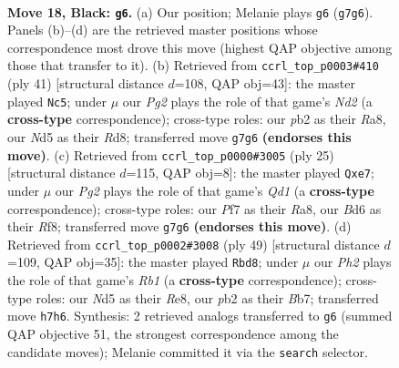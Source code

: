 \documentclass[11pt]{article}
\begin{document}
\clearpage

\begin{figure}[p]\centering
\begin{subfigure}{0.46\textwidth}\centering
\resizebox{\linewidth}{!}{%
\newchessgame
\chessboard[
  setfen={r6r/p2nkppp/2pbp3/1q1n1PP1/Np1P3N/4P2P/PP6/R1BQ1RK1 b - - 0 18},
  showmover=false,
  pgfstyle=straightmove, color=movearrow, markmove={g7-g6}
]}
\caption{}
\end{subfigure}\hfill
\begin{subfigure}{0.46\textwidth}\centering
\resizebox{\linewidth}{!}{%
\newchessgame
\chessboard[
  setfen={r2r2k1/1p1n1pbp/2p2np1/p3pP2/P2qP3/2N2QP1/1PP3BP/R1B1K2R b KQ - 8 21},
  showmover=false,
  pgfstyle=straightmove, color=movearrow, markmove={d7-c5}
]}
\caption{}
\end{subfigure}
\\[4pt]
\begin{subfigure}{0.46\textwidth}\centering
\resizebox{\linewidth}{!}{%
\newchessgame
\chessboard[
  setfen={r2q1rk1/1p2Nppp/3pbn2/4p3/p1PnP3/4BP2/PP1Q2PP/R1N1KB1R b KQ - 0 13},
  showmover=false,
  pgfstyle=straightmove, color=movearrow, markmove={d8-e7}
]}
\caption{}
\end{subfigure}\hfill
\begin{subfigure}{0.46\textwidth}\centering
\resizebox{\linewidth}{!}{%
\newchessgame
\chessboard[
  setfen={1r2r1k1/1b3pp1/pp1pp3/6qn/2P1PnNp/4RP2/PPRQN1PP/5BK1 b - - 6 25},
  showmover=false,
  pgfstyle=straightmove, color=movearrow, markmove={b8-d8}
]}
\caption{}
\end{subfigure}
\caption{\textbf{Move 18, Black: \texttt{g6}.} (a) Our position; Melanie plays \texttt{g6} (\texttt{g7g6}). Panels (b)--(d) are the retrieved master positions whose correspondence most drove this move (highest QAP objective among those that transfer to it). (b) Retrieved from \texttt{ccrl\_top\_p0003\#410} (ply 41) [structural distance $d$=108, QAP obj=43]: the master played \texttt{Nc5}; under $\mu$ our \emph{Pg2} plays the role of that game's \emph{Nd2} (a \textbf{cross-type} correspondence); cross-type roles: our \emph{p}b2 as their \emph{R}a8, our \emph{N}d5 as their \emph{R}d8; transferred move \texttt{g7g6} \textbf{(endorses this move)}. (c) Retrieved from \texttt{ccrl\_top\_p0000\#3005} (ply 25) [structural distance $d$=115, QAP obj=8]: the master played \texttt{Qxe7}; under $\mu$ our \emph{Pg2} plays the role of that game's \emph{Qd1} (a \textbf{cross-type} correspondence); cross-type roles: our \emph{P}f7 as their \emph{R}a8, our \emph{B}d6 as their \emph{R}f8; transferred move \texttt{g7g6} \textbf{(endorses this move)}. (d) Retrieved from \texttt{ccrl\_top\_p0002\#3008} (ply 49) [structural distance $d$=109, QAP obj=35]: the master played \texttt{Rbd8}; under $\mu$ our \emph{Ph2} plays the role of that game's \emph{Rb1} (a \textbf{cross-type} correspondence); cross-type roles: our \emph{N}d5 as their \emph{R}e8, our \emph{p}b2 as their \emph{B}b7; transferred move \texttt{h7h6}. Synthesis: 2 retrieved analogs transferred to \texttt{g6} (summed QAP objective 51, the strongest correspondence among the candidate moves); Melanie committed it via the \texttt{search} selector.}
\label{fig:thought-m35}
\end{figure}
\end{document}

